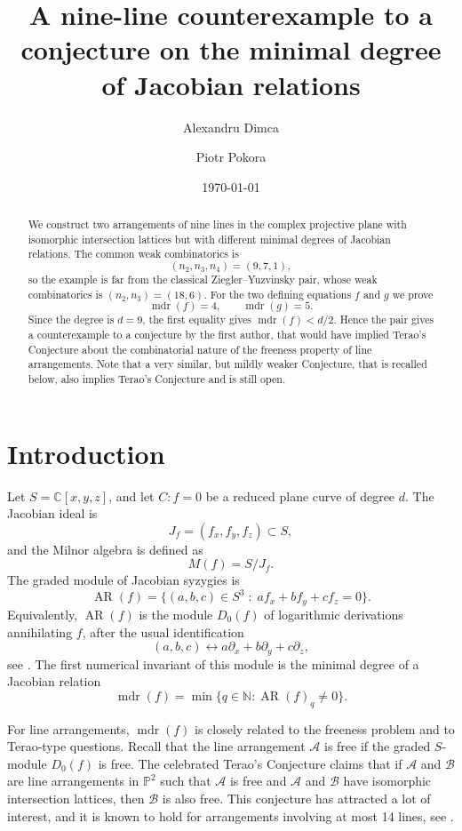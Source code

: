 \documentclass[11pt]{amsart}
\title[A nine-line counterexample]{A nine-line counterexample to a conjecture on the minimal degree of Jacobian relations}
\author{Alexandru Dimca}
\author{Piotr Pokora}
\date{\today}
\newcommand{\PP}{\mathbb P}
\newcommand{\CC}{\mathbb C}
\newcommand{\NN}{\mathbb N}
\newcommand{\cA}{\mathcal A}
\newcommand{\cB}{\mathcal B}
\newcommand{\AR}{\operatorname{AR}}
\newcommand{\mdr}{\operatorname{mdr}}
\theoremstyle{plain}
\theoremstyle{definition}
\numberwithin{equation}{section}
\begin{document}
\begin{abstract}
We construct two arrangements of nine lines in the complex projective plane with isomorphic intersection lattices but with different minimal degrees of Jacobian relations.  The common weak combinatorics is
\[
(n_2,n_3,n_4)=(9,7,1),
\]
so the example is far from the classical Ziegler--Yuzvinsky pair, whose weak combinatorics is \((n_{2},n_{3}) = (18,6)\).  For the two defining equations \(f\) and \(g\) we prove
\[
\mdr(f)=4,\qquad \mdr(g)=5.
\]
Since the degree is \(d=9\), the first equality gives \(\mdr(f)<d/2\).  Hence the pair gives a counterexample to a conjecture by the first author, that would have implied Terao's Conjecture about the combinatorial nature of the freeness property of line arrangements. Note that a very similar, but mildly weaker Conjecture, that is recalled below, also implies Terao's Conjecture and  is still open.
\end{abstract}

\maketitle

\section{Introduction}
Let \(S=\CC[x,y,z]\), and let \(C:f=0\) be a reduced plane curve of degree \(d\).  The Jacobian ideal is
\[
J_f=(f_x,f_y,f_z)\subset S,
\]
and the Milnor algebra is defined as
\[
M(f)=S/J_f.
\]
The graded module of Jacobian syzygies is
\[
\AR(f)=\{(a,b,c)\in S^3\;:\; a f_x+b f_y+c f_z=0\}.
\]
Equivalently, \(\AR(f)\) is the module \(D_0(f)\) of logarithmic derivations annihilating \(f\), after the usual identification
\[
(a,b,c)\longleftrightarrow a\partial_x+b\partial_y+c\partial_z,
\]
see \cite[Section 8.1]{DimcaBook}. The first numerical invariant of this module is the minimal degree of a Jacobian relation
\[
\mdr(f)=\min\{q\in\NN:\AR(f)_q\neq 0\}.
\]

For line arrangements, \(\mdr(f)\) is closely related to the freeness problem and to Terao-type questions.  Recall that the line arrangement $\cA$ is free if the graded $S$-module $D_0(f)$ is free. The celebrated Terao's Conjecture claims that if $\cA$ and $\cB$ are line arrangements in $\PP^2$ such that $\cA$ is free and $\cA$ and $\cB$ have isomorphic intersection lattices, then $\cB$ is also free. This conjecture has attracted a lot of interest, and it is known to hold for arrangements involving at most 14 lines, see \cite{BK, DIM13}.
\end{document}
